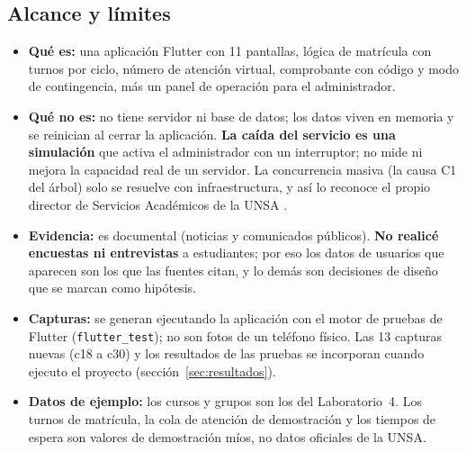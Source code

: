 \subsection{Alcance y límites}
\begin{itemize}
	\item \textbf{Qué es:} una aplicación Flutter con 11 pantallas, lógica de matrícula con turnos por ciclo, número de atención virtual, comprobante con código y modo de contingencia, más un panel de operación para el administrador.
	\item \textbf{Qué no es:} no tiene servidor ni base de datos; los datos viven en memoria y se reinician al cerrar la aplicación. \textbf{La caída del servicio es una simulación} que activa el administrador con un interruptor; no mide ni mejora la capacidad real de un servidor. La concurrencia masiva (la causa C1 del árbol) solo se resuelve con infraestructura, y así lo reconoce el propio director de Servicios Académicos de la UNSA \cite{elpueblo25}.
	\item \textbf{Evidencia:} es documental (noticias y comunicados públicos). \textbf{No realicé encuestas ni entrevistas} a estudiantes; por eso los datos de usuarios que aparecen son los que las fuentes citan, y lo demás son decisiones de diseño que se marcan como hipótesis.
	\item \textbf{Capturas:} se generan ejecutando la aplicación con el motor de pruebas de Flutter (\texttt{flutter\_test}); no son fotos de un teléfono físico. Las 13 capturas nuevas (c18 a c30) y los resultados de las pruebas se incorporan cuando ejecuto el proyecto (sección~\ref{sec:resultados}).
	\item \textbf{Datos de ejemplo:} los cursos y grupos son los del Laboratorio~4. Los turnos de matrícula, la cola de atención de demostración y los tiempos de espera son valores de demostración míos, no datos oficiales de la UNSA.
\end{itemize}
